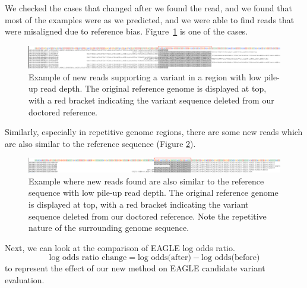 We checked the cases that changed after we found the read, and we found that most of the examples were as we predicted, and we were able to find reads that were misaligned due to reference bias. Figure~\ref{low_new_ALTread} is one of the cases.

\newcommand*{\ExplainRedBracket}{The original reference genome is displayed at top, with a red bracket indicating the variant sequence deleted from our doctored reference}


\begin{figure}[H]
\includegraphics[width=1\columnwidth]{body/image/low_new_ALTread.png}
\caption[New reads in a region with low pile-up read depth]
{Example of new reads supporting a variant in a region with low pile-up read depth.
\ExplainRedBracket.
}
\label{low_new_ALTread}
\end{figure}

Similarly, especially in repetitive genome regions, there are some new reads which are also similar to the reference sequence (Figure \ref{low_new_REFread}).

\begin{figure}[H]
\includegraphics[width=1\columnwidth]{body/image/low_new_REFread.png}
\caption[New reads are similar to the reference with low pile-up read depth]
{Example where new reads found are also similar to the reference sequence with low pile-up read depth.
\ExplainRedBracket.
Note the repetitive nature of the surrounding genome sequence.}
\label{low_new_REFread}
\end{figure}

Next, we can look at the comparison of EAGLE log odds ratio.
\begin{equation*}
\text{log odds ratio change} = \text{log odds(after)} - \text{log odds(before)}
\end{equation*}
to represent the effect of our new method on EAGLE candidate variant evaluation.

